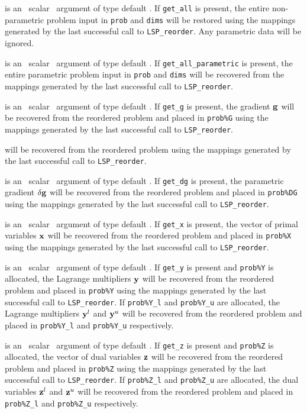 \documentclass{galahad}
\newcommand{\packagename}{LSP}
\begin{document}
\begin{description}
is an \optional\ scalar \intentin\ argument of type default \logical.
If {\tt get\_all} is present, the entire non-parametric problem
input in {\tt prob} and {\tt dims} will be restored using the
mappings generated by the last successful call to {\tt \packagename\_reorder}.
Any parametric data will be ignored.

is an \optional\ scalar \intentin\ argument of type default \logical.
If {\tt get\_all\_parametric} is present, the entire parametric problem
input in {\tt prob} and {\tt dims} will be recovered from the
mappings generated by the last successful call to {\tt \packagename\_reorder}.

is an \optional\ scalar \intentin\ argument of type default \logical.
If {\tt get\_g} is present, the gradient ${\mathbf{g}}$
will be recovered from  the reordered problem and placed in {\tt prob\%G}
using the mappings generated by the last successful call to
{\tt \packagename\_reorder}.

will be recovered from  the reordered problem using the
mappings generated by the last successful call to {\tt \packagename\_reorder}.

is an \optional\ scalar \intentin\ argument of type default \logical.
If {\tt get\_dg} is present, the parametric gradient $\delta {\mathbf{g}}$
will be recovered from  the reordered problem and placed in {\tt prob\%DG}
using the mappings generated by the last successful call to
{\tt \packagename\_reorder}.

is an \optional\ scalar \intentin\ argument of type default \logical.
If {\tt get\_x} is present, the vector of primal variables ${\mathbf{x}}$
will be recovered from  the reordered problem and placed in {\tt prob\%X}
using the mappings generated by the last successful call to
{\tt \packagename\_reorder}.

is an \optional\ scalar \intentin\ argument of type default \logical.
If {\tt get\_y} is present and {\tt prob\%Y} is allocated,
the Lagrange multipliers
${\mathbf{y}}$ will be recovered from  the reordered problem and placed in {\tt prob\%Y}
using the mappings generated by the last successful call to
{\tt \packagename\_reorder}. If {\tt prob\%Y\_l} and {\tt prob\%Y\_u}
are allocated, the Lagrange multipliers
${\mathbf{y}}^l$ and ${\mathbf{y}}^u$ will be recovered from  the reordered problem and
placed in {\tt prob\%Y\_l} and {\tt prob\%Y\_u} respectively.

is an \optional\ scalar \intentin\ argument of type default \logical.
If {\tt get\_z} is present and {\tt prob\%Z} is allocated,
the vector of dual variables ${\mathbf{z}}$
will be recovered from  the reordered problem and placed in {\tt prob\%Z}
using the mappings generated by the last successful call to
{\tt \packagename\_reorder}. If {\tt prob\%Z\_l} and {\tt prob\%Z\_u}
are allocated, the dual variables
${\mathbf{z}}^l$ and ${\mathbf{z}}^u$ will be recovered from  the reordered problem and
placed in {\tt prob\%Z\_l} and {\tt prob\%Z\_u} respectively.


\end{description}
\end{document}
